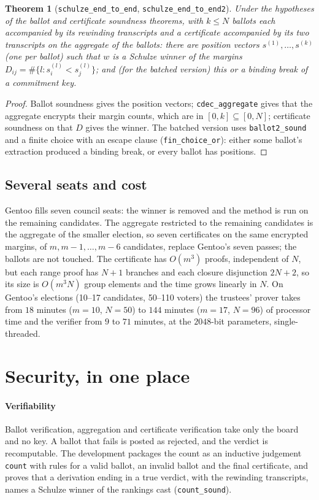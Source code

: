 \documentclass[11pt,a4paper]{article}
\newcommand{\rocq}[1]{\texttt{#1}}
\newtheorem{theorem}{Theorem}[section]
\theoremstyle{remark}
\begin{document}
\begin{theorem}[\rocq{schulze\_end\_to\_end}, \rocq{schulze\_end\_to\_end2}]
Under the hypotheses of the ballot and certificate soundness theorems,
with $k \le N$ ballots each accompanied by its rewinding transcripts and a
certificate accompanied by its two transcripts on the aggregate of the
ballots: there are position vectors $s^{(1)}, \ldots, s^{(k)}$ (one per
ballot) such that $w$ is a Schulze winner of the margins $D_{ij} = \#\{l :
s^{(l)}_i < s^{(l)}_j\}$; and (for the batched version) this or a binding
break of a commitment key.
\end{theorem}
\begin{proof}
Ballot soundness gives the position vectors; \rocq{cdec\_aggregate} gives
that the aggregate encrypts their margin counts, which are in $[0, k]
\subseteq [0, N]$; certificate soundness on that $D$ gives the winner. The
batched version uses \rocq{ballot2\_sound} and a finite choice with an
escape clause (\rocq{fin\_choice\_or}): either some ballot's extraction
produced a binding break, or every ballot has positions.
\end{proof}

\subsection{Several seats and cost}
Gentoo fills seven council seats: the winner is removed and the method is
run on the remaining candidates. The aggregate restricted to the remaining
candidates is the aggregate of the smaller election, so seven certificates
on the same encrypted margins, of $m, m-1, \ldots, m-6$ candidates, replace
Gentoo's seven passes; the ballots are not touched. The certificate has
$O(m^3)$ proofs, independent of $N$, but each range proof has $N+1$
branches and each closure disjunction $2N + 2$, so its size is $O(m^3 N)$
group elements and the time grows linearly in $N$. On Gentoo's elections
(10--17 candidates, 50--110 voters) the trustees' prover takes from $18$
minutes ($m = 10$, $N = 50$) to $144$ minutes ($m = 17$, $N = 96$) of
processor time and the verifier from $9$ to $71$ minutes, at the
$2048$-bit parameters, single-threaded.

\section{Security, in one place}\label{sec:security}

\paragraph{Verifiability} Ballot verification, aggregation and certificate
verification take only the board and no key. A ballot that fails is posted
as rejected, and the verdict is recomputable. The development packages the
count as an inductive judgement \rocq{count} with rules for a valid ballot,
an invalid ballot and the final certificate, and proves that a derivation
ending in a true verdict, with the rewinding transcripts, names a Schulze
winner of the rankings cast (\rocq{count\_sound}).
\end{document}
